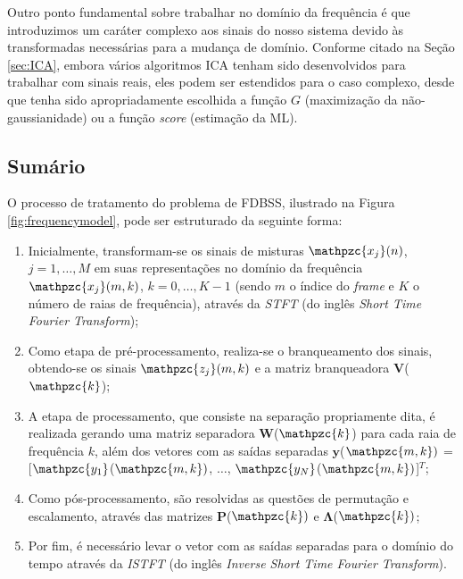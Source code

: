         Outro ponto fundamental sobre trabalhar no domínio da frequência é que introduzimos um caráter complexo aos sinais do nosso sistema devido às transformadas necessárias para a mudança de domínio. Conforme citado na Seção \ref{sec:ICA}, embora vários algoritmos ICA tenham sido desenvolvidos para trabalhar com sinais reais, eles podem ser estendidos para o caso complexo, desde que tenha sido apropriadamente escolhida a função $G$ (maximização da não-gaussianidade) ou a função \textit{score} (estimação da ML). 
        
    \subsection{Sumário}
        O processo de tratamento do problema de FDBSS, ilustrado na Figura \ref{fig:frequencymodel}, pode ser estruturado da seguinte forma:
        
        \begin{enumerate}
            \item Inicialmente, transformam-se os sinais de misturas $\mathpzc{x_j}(n)$, $j = 1,\dots,M$ em suas representações no domínio da frequência $\mathpzc{x_j}(m,k)$, $k = 0, \dots, K-1$ (sendo $m$ o índice do \textit{frame} e $K$ o número de raias de frequência), através da \textit{STFT} (do inglês \textit{Short Time Fourier Transform});
            
            \item Como etapa de pré-processamento, realiza-se o branqueamento dos sinais, obtendo-se os sinais $\mathpzc{z_j}(m,k)$ e a matriz branqueadora $\mathbf{V}$($\mathpzc{k}$);
            
            \item A etapa de processamento, que consiste na separação propriamente dita, é realizada gerando uma matriz separadora $\mathbf{W}$($\mathpzc{k}$) para cada raia de frequência $k$, além dos vetores com as saídas separadas $\mathbf{y}$($\mathpzc{m,k})$ = [$\mathpzc{y_1}$($\mathpzc{m,k})$, $\dots$, $\mathpzc{y_N}$($\mathpzc{m,k})$]$^T$;
            
            \item Como pós-processamento, são resolvidas as questões de permutação e escalamento, através das matrizes $\mathbf{P}$($\mathpzc{k})$ e $\mathbf{\Lambda}$($\mathpzc{k})$;
            
            \item Por fim, é necessário levar o vetor com as saídas separadas para o domínio do tempo através da \textit{ISTFT} (do inglês \textit{Inverse Short Time Fourier Transform}).
            
        \end{enumerate}

